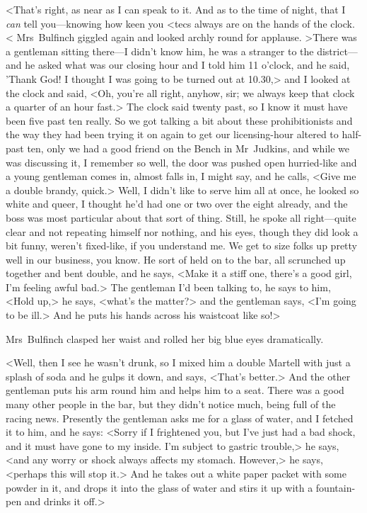<That's right, as near as I can speak to it. And as to the time of night, that I \emph{can} tell you—knowing how keen you <tecs always are on the hands of the clock.< Mrs~Bulfinch giggled again and looked archly round for applause. >There was a gentleman sitting there—I didn't know him, he was a stranger to the district—and he asked what was our closing hour and I told him 11 o'clock, and he said, 'Thank God! I thought I was going to be turned out at 10.30,> and I looked at the clock and said, <Oh, you're all right, anyhow, sir; we always keep that clock a quarter of an hour fast.> The clock said twenty past, so I know it must have been five past ten really. So we got talking a bit about these prohibitionists and the way they had been trying it on again to get our licensing-hour altered to half-past ten, only we had a good friend on the Bench in Mr~Judkins, and while we was discussing it, I remember so well, the door was pushed open hurried-like and a young gentleman comes in, almost falls in, I might say, and he calls, <Give me a double brandy, quick.> Well, I didn't like to serve him all at once, he looked so white and queer, I thought he'd had one or two over the eight already, and the boss was most particular about that sort of thing. Still, he spoke all right—quite clear and not repeating himself nor nothing, and his eyes, though they did look a bit funny, weren't fixed-like, if you understand me. We get to size folks up pretty well in our business, you know. He sort of held on to the bar, all scrunched up together and bent double, and he says, <Make it a stiff one, there's a good girl, I'm feeling awful bad.> The gentleman I'd been talking to, he says to him, <Hold up,> he says, <what's the matter?> and the gentleman says, <I'm going to be ill.> And he puts his hands across his waistcoat like so!>

Mrs~Bulfinch clasped her waist and rolled her big blue eyes dramatically.

<Well, then I see he wasn't drunk, so I mixed him a double Martell with just a splash of soda and he gulps it down, and says, <That's better.> And the other gentleman puts his arm round him and helps him to a seat. There was a good many other people in the bar, but they didn't notice much, being full of the racing news. Presently the gentleman asks me for a glass of water, and I fetched it to him, and he says: <Sorry if I frightened you, but I've just had a bad shock, and it must have gone to my inside. I'm subject to gastric trouble,> he says, <and any worry or shock always affects my stomach. However,> he says, <perhaps this will stop it.> And he takes out a white paper packet with some powder in it, and drops it into the glass of water and stirs it up with a fountain-pen and drinks it off.>

